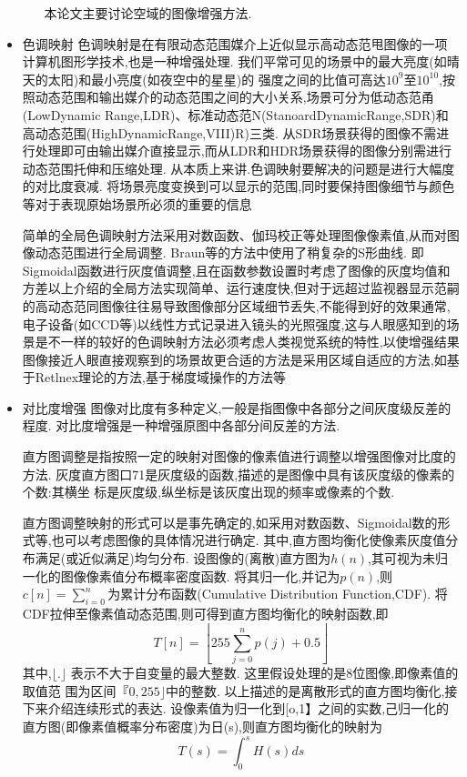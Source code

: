 \documentclass{amsart}
\begin{document}
\begin{itemize}
\begin{itemize}
本论文主要讨论空域的图像增强方法.
\end{itemize}
\item 色调映射
  色调映射是在有限动态范围媒介上近似显示高动态范甩图像的一项计算机图形学技术,也是一种增强处理.
我们平常可见的场景中的最大亮度(如晴天的太阳)和最小亮度(如夜空中的星星)的
强度之间的比值可高达$10^9$至$10^{10}$,按照动态范围和输出媒介的动态范围之间的大小关系,场景可分为低动态范甬(LowDynamic Range,LDR)、标准动态范N(StanoardDynamicRange,SDR)和高动态范围(HighDynamicRange,VIII)R)三类.
从SDR场景获得的图像不需进行处理即可由输出媒介直接显示,而从LDR和HDR场景获得的图像分别需进行动态范围托伸和压缩处理.
从本质上来讲.色调映射要解决的问题是进行大幅度的对比度衰减.
将场景亮度变换到可以显示的范围,同时要保持图像细节与颜色等对于表现原始场景所必须的重要的信息

简单的全局色调映射方法采用对数函数、伽玛校正等处理图像像素值,从而对图像动态范围进行全局调整.
Braun等的方法中使用了稍复杂的S形曲线.
即Sigmoidal函数进行灰度值调整,且在函数参数设置时考虑了图像的灰度均值和方差以上介绍的全局方法实现简单、运行速度快,但对于远超过监视器显示范嗣的高动态范同图像往往易导致图像部分区域细节丢失,不能得到好的效果通常,电子设备(如CCD等)以线性方式记录进入镜头的光照强度,这与人眼感知到的场景是不一样的较好的色调映射方法必须考虑人类视觉系统的特性,以使增强结果图像接近人眼直接观察到的场景故更合适的方法是采用区域自适应的方法,如基于Retlnex理论的方法,基于梯度域操作的方法等
\item 对比度增强
  图像对比度有多种定义,一般是指图像中各部分之间灰度级反差的程度.
  对比度增强是一种增强原图中各部分间反差的方法.


  直方图调整是指按照一定的映射对图像的像素值进行调整以增强图像对比度的方法.
  灰度直方图口71是灰度级的函数,描述的是图像中具有该灰度级的像素的个数:其横坐
  标是灰度级,纵坐标是该灰度出现的频率或像素的个数.


  直方图调整映射的形式可以是事先确定的,如采用对数函数、Sigmoidal数的形式等,也可以考虑图像的具体情况进行确定.
  其中,直方图均衡化使像素灰度值分布满足(或近似满足)均匀分布.
  设图像的(离散)直方图为$h(n)$,其可视为未归一化的图像像素值分布概率密度函数.
  将其归一化,并记为$p(n)$,则$c[n]=\sum_{i=0}^n$为累计分布函数(Cumulative Distribution Function,CDF).
  将CDF拉伸至像素值动态范围,则可得到直方图均衡化的映射函数,即
  \begin{equation}
    \label{eq:11}
    T[n]=\left\lfloor 255 \sum_{j=0}^{n} p(j)+0.5\right\rfloor
  \end{equation}
  其中,$\lfloor.\rfloor$ 表示不大于自变量的最大整数.
  这里假设处理的是8位图像,即像素值的取值范
  围为区间$『0,255\rfloor$中的整数.
  以上描述的是离散形式的直方图均衡化,接下来介绍连续形式的表达.
  设像素值为归一化到[o,1】之间的实数,己归一化的直方图(即像素值概率分布密度)为日(s),则直方图均衡化的映射为
  \begin{equation}
    \label{eq:12}
   T(s)=\int_{0}^s H(s) d s
  \end{equation}



\end{itemize}
\end{document}
